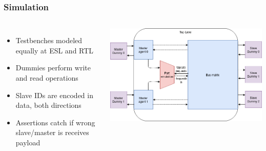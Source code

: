 \documentclass[]{beamer}
\begin{document}
         \begin{frame}
           \frametitle{Simulation}
           \begin{columns}
              \begin{itemize}
               \item<1-> Testbenches modeled equally at ESL and RTL
               \item<2-> Dummies perform write and read operations
               \item<3-> Slave IDs are encoded in data, both directions
               \item<4-> Assertions catch if wrong slave/master is receives payload 
              \end{itemize}
             \includegraphics[width=\textwidth]{pics/tb_esl.png}
           \end{columns}
         \end{frame}
\end{document}
